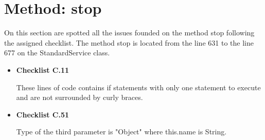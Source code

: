 \documentclass[../../../../dd.tex]{subfiles}
\begin{document}
	\section{Method: stop}

		On this section are spotted all the issues founded on the method stop following the assigned checklist.
		The method stop is located from the line 631 to the line 677 on the StandardService class.
		\begin{itemize}

			\item \textbf{Checklist C.11}

				  

				  These lines of code contains if statements with only one statement to execute and are not surrounded by curly braces.

			\item \textbf{Checklist C.51}

				  

				  Type of the third parameter is "Object" where this.name is String.
				  
		\end{itemize}
\end{document}
